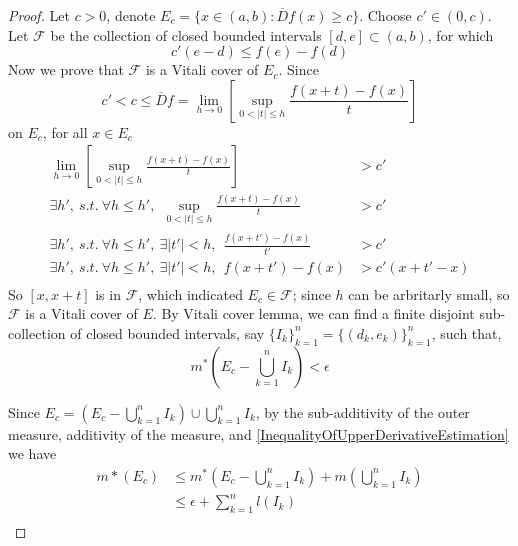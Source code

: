 \documentclass[lang=en, 12pt]{elegantbook}
\begin{document}
        \begin{proof}
            Let $c>0$, denote $E_c = \{x \in (a,b) : \overline{D} f(x) \geq c\}$. Choose $c' \in (0,c)$. Let $\mathcal{F}$ be the collection of 
        closed bounded intervals $[d,e] \subset (a,b)$, for which 
        \begin{equation}\label{InequalityOfUpperDerivativeEstimation}
            c'(e-d) \leq f(e)-f(d)
        \end{equation}
            Now we prove that $\mathcal{F}$ is a Vitali cover of $E_c$. Since $$c' < c \leq \overline{D}f =\lim_{h \to 0} \left[ \sup_{0<|t|\leq h} \frac{f(x+t)-f(x)}{t}\right] $$ 
        on $E_c$, for all $x \in E_c$
            \begin{equation*}
                \begin{aligned}
                    \lim_{h \to 0} \left[ \sup_{0<|t|\leq h} \frac{f(x+t)-f(x)}{t}\right] &> c'\\
                    \exists h', \ s.t. \ \forall h \leq h', \ \ \sup_{0<|t|\leq h} \frac{f(x+t)-f(x)}{t} &> c'\\
                    \exists h', \ s.t. \ \forall h \leq h', \ \exists |t'| < h, \ \ \frac{f(x+t')-f(x)}{t'} &> c'\\
                    \exists h', \ s.t. \ \forall h \leq h', \ \exists |t'| < h, \ \  f(x+t')-f(x) &> c'(x+t' - x)\\
                \end{aligned}
            \end{equation*}
            So $[x, x+t]$ is in $\mathcal{F}$, which indicated $E_c \in \mathcal{F}$; since $h$ can be arbritarly small, so $\mathcal{F}$
        is a Vitali cover of $E$. By Vitali cover lemma, we can find a finite disjoint sub-collection of closed bounded intervals, say 
        $\{I_k\}_{k=1}^{n}=\{(d_k, e_k)\}_{k=1}^{n}$,
        such that, $$ m^*(E_c - \bigcup_{k=1}^{n}I_k) < \epsilon$$\par
            Since $E_c =( E_c - \bigcup_{k=1}^{n}I_k )\cup \bigcup_{k=1}^{n}I_k$, by the sub-additivity of the outer measure, 
        additivity of the measure, and \eqref{InequalityOfUpperDerivativeEstimation} we have 
            \begin{equation*}
                \begin{aligned}
                    m*(E_c) &\leq m^*(E_c-\bigcup_{k=1}^{n}I_k) + m(\bigcup_{k=1}^{n}I_k)\\
                    &\leq \epsilon + \sum_{k=1}^{n}l(I_k)\\

\end{aligned}
\end{equation*}
\end{proof}
\end{document}
